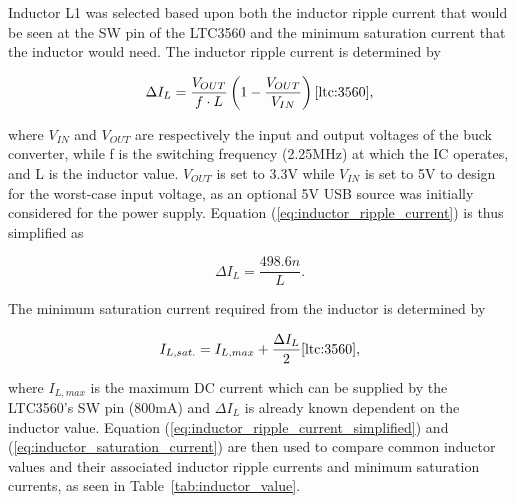Inductor L1 was selected based upon both the inductor ripple current that would be seen at the SW pin of the LTC3560 and the minimum saturation current that the inductor would need. The inductor ripple current is determined by

\begin{equation}
\label{eq:inductor_ripple_current}
    {\Delta}I_{L} = \frac{V_{OUT}}{f\cdot L}\left(1-\frac{V_{OUT}}{V_{IN}}\right) \cite{ltc:3560},
\end{equation}

where $V_{IN}$ and $V_{OUT}$ are respectively the input and output voltages of the buck converter, while f is the switching frequency (2.25MHz) at which the IC operates, and L is the inductor value. $V_{OUT}$ is set to 3.3V while $V_{IN}$ is set to 5V to design for the worst-case input voltage, as an optional 5V USB source was initially considered for the power supply. Equation (\ref{eq:inductor_ripple_current}) is thus simplified as

\begin{equation}
\label{eq:inductor_ripple_current_simplified}
    {\Delta}I_{L} = \frac{498.6n}{L}.
\end{equation}

The minimum saturation current required from the inductor is determined by

\begin{equation}
\label{eq:inductor_saturation_current}
    I_{L,sat.} = I_{L,max} + \frac{{\Delta}I_{L}}{2} \cite{ltc:3560},
\end{equation}

where $I_{L,max}$ is the maximum DC current which can be supplied by the LTC3560's SW pin (800mA) and ${\Delta}I_{L}$ is already known dependent on the inductor value. Equation (\ref{eq:inductor_ripple_current_simplified}) and (\ref{eq:inductor_saturation_current}) are then used to compare common inductor values and their associated inductor ripple currents and minimum saturation currents, as seen in Table~\ref{tab:inductor_value}.


